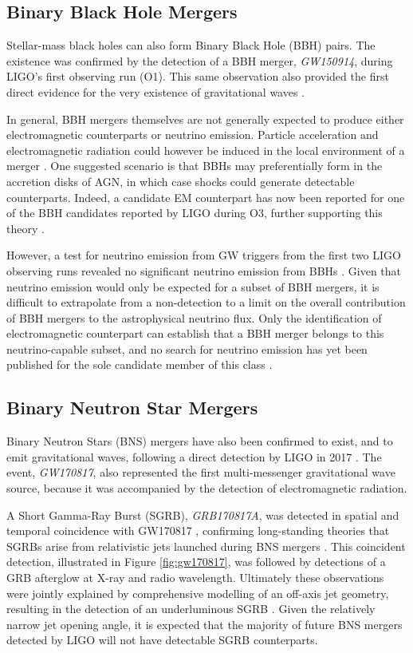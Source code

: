 \subsection*{Binary Black Hole Mergers}

Stellar-mass black holes can also form Binary Black Hole (BBH) pairs. The existence was confirmed by the detection of a BBH merger, \emph{GW150914}, during LIGO's first observing run (O1). This same observation also provided the first direct evidence for the very existence of gravitational waves .

In general, BBH mergers themselves are not generally expected to produce either electromagnetic counterparts or neutrino emission. Particle acceleration and electromagnetic radiation could however be induced in the local environment of a merger . One suggested scenario is that BBHs may preferentially form in the accretion disks of AGN, in which case shocks could generate detectable counterparts. Indeed, a candidate EM counterpart has now been reported for one of the BBH candidates reported by LIGO during O3, further supporting this theory .

However, a test for neutrino emission from GW triggers from the first two LIGO observing runs revealed no significant neutrino emission from BBHs . Given that neutrino emission would only be expected for a subset of BBH mergers, it is difficult to extrapolate from a non-detection to a limit on the overall contribution of BBH mergers to the astrophysical neutrino flux. Only the identification of electromagnetic counterpart can establish that a BBH merger belongs to this neutrino-capable subset, and no search for neutrino emission has yet been published for the sole candidate member of this class \cite{graham_gw_20}.

\subsection*{Binary Neutron Star Mergers}

Binary Neutron Stars (BNS) mergers have also been confirmed to exist, and to emit gravitational waves, following a direct detection by LIGO in 2017 . The event, \emph{GW170817}, also represented the first multi-messenger gravitational wave source, because it was accompanied by the detection of electromagnetic radiation.

A Short Gamma-Ray Burst (SGRB), \emph{GRB170817A}, was detected in spatial and temporal coincidence with GW170817 , confirming long-standing theories that SGRBs arise from relativistic jets launched during BNS mergers . This coincident detection, illustrated in Figure \ref{fig:gw170817}, was followed by detections of a GRB afterglow at X-ray and radio wavelength. Ultimately these observations were jointly explained by comprehensive modelling of an off-axis jet geometry, resulting in the detection of an underluminous SGRB . Given the relatively narrow jet opening angle, it is expected that the majority of future BNS mergers detected by LIGO will not have detectable SGRB counterparts.

